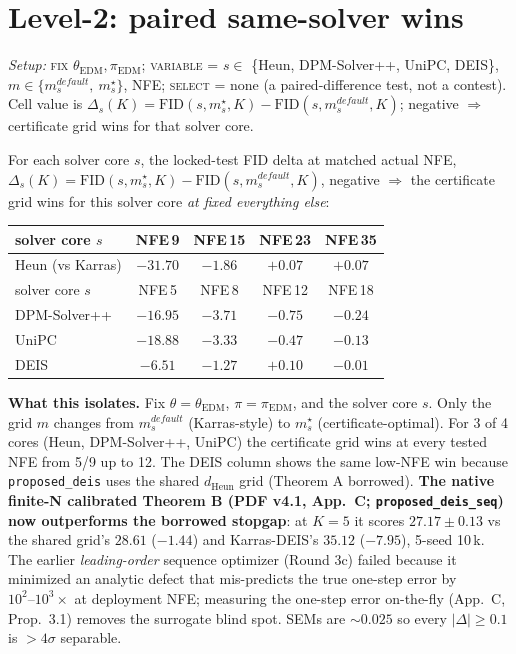 \documentclass[11pt]{article}
\begin{document}
\section{Level-2: paired same-solver wins}

\noindent\textit{Setup:} \textsc{fix} \(\theta_{\mathrm{EDM}},
\pi_{\mathrm{EDM}}\); \textsc{variable} = \(s \in\) \{Heun, DPM-Solver++,
UniPC, DEIS\}, \(m \in \{m_s^{default},\ m_s^\star\}\), NFE; \textsc{select}
= none (a paired-difference test, not a contest). Cell value is
\(\Delta_s(K) = \mathrm{FID}(s, m_s^\star, K) - \mathrm{FID}(s, m_s^{default}, K)\);
negative \(\Rightarrow\) certificate grid wins for that solver core.

For each solver core \(s\), the locked-test FID delta at matched actual NFE,
\(\Delta_s(K) = \mathrm{FID}(s, m_s^\star, K) - \mathrm{FID}(s, m_s^{default}, K)\),
negative \(\Rightarrow\) the certificate grid wins for this solver core
\emph{at fixed everything else}:

\begin{center}
\small
\begin{tabular}{l c c c c}
\toprule
solver core \(s\) & NFE\,9 & NFE\,15 & NFE\,23 & NFE\,35 \\
\midrule
Heun (vs Karras)         & \(-31.70\) & \( -1.86\) & \(+0.07\) & \(+0.07\) \\
\midrule
solver core \(s\) & NFE\,5 & NFE\,8 & NFE\,12 & NFE\,18 \\
\midrule
DPM-Solver++         & \(-16.95\) & \( -3.71\) & \(-0.75\) & \(-0.24\) \\
UniPC                & \(-18.88\) & \( -3.33\) & \(-0.47\) & \(-0.13\) \\
DEIS                 & \( -6.51\) & \( -1.27\) & \(+0.10\) & \(-0.01\) \\
\bottomrule
\end{tabular}
\end{center}

\noindent
\textbf{What this isolates.} Fix \(\theta = \theta_{\mathrm{EDM}}\),
\(\pi = \pi_{\mathrm{EDM}}\), and the solver core \(s\). Only the
grid \(m\) changes from \(m_s^{default}\) (Karras-style) to \(m_s^\star\)
(certificate-optimal). For 3 of 4 cores (Heun, DPM-Solver++, UniPC) the
certificate grid wins at every tested NFE from 5/9 up to 12. The DEIS
column shows the same low-NFE win because \texttt{proposed\_deis} uses
the shared \(d_{\mathrm{Heun}}\) grid (Theorem A borrowed). \textbf{The
native finite-N calibrated Theorem B (PDF v4.1, App.~C;
\texttt{proposed\_deis\_seq}) now outperforms the borrowed stopgap}: at
\(K{=}5\) it scores \(27.17{\pm}0.13\) vs the shared grid's \(28.61\)
(\(-1.44\)) and Karras-DEIS's \(35.12\) (\(-7.95\)), 5-seed 10\,k. The
earlier \emph{leading-order} sequence optimizer (Round 3c) failed because
it minimized an analytic defect that mis-predicts the true one-step error
by \(10^2\text{--}10^3\times\) at deployment NFE; measuring the one-step
error on-the-fly (App.~C, Prop.~3.1) removes the surrogate blind spot.
SEMs are \(\sim 0.025\) so every \(|\Delta| \ge 0.1\) is \(>4\sigma\)
separable.
\end{document}
